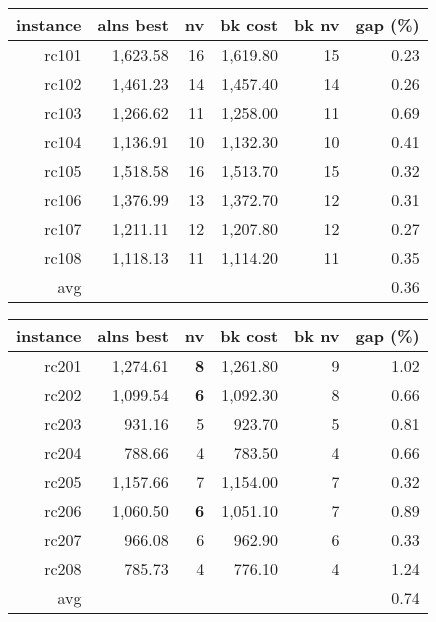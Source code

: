   \begin{table}[caption={Kết quả đo với tập Solomon RC1}, label=exp:solomonRC1, placement=h]
    \small
    \centering
    \begin{tabular}{rrrrrr}
    \hline
    instance & alns best & nv & bk cost & bk nv & gap (\%) \\ \hline
    rc101 & 1,623.58 & 16 & 1,619.80 & 15 & 0.23 \\ \hline
    rc102 & 1,461.23 & 14 & 1,457.40 & 14 & 0.26 \\ \hline
    rc103 & 1,266.62 & 11 & 1,258.00 & 11 & 0.69 \\ \hline
    rc104 & 1,136.91 & 10 & 1,132.30 & 10 & 0.41 \\ \hline
    rc105 & 1,518.58 & 16 & 1,513.70 & 15 & 0.32 \\ \hline
    rc106 & 1,376.99 & 13 & 1,372.70 & 12 & 0.31 \\ \hline
    rc107 & 1,211.11 & 12 & 1,207.80 & 12 & 0.27 \\ \hline
    rc108 & 1,118.13 & 11 & 1,114.20 & 11 & 0.35 \\ \hline
    avg &  &  &  &  & 0.36 \\ \hline
    \end{tabular}
  \end{table}

  \begin{table}[caption={Kết quả đo với tập Solomon RC2}, label=exp:solomonRC2, placement=h]
    \small
    \centering
    \begin{tabular}{rrrrrr}
    \hline
    instance & alns best & nv & bk cost & bk nv & gap (\%) \\ \hline
    rc201 & 1,274.61 & \textbf{8} & 1,261.80 & 9 & 1.02 \\ \hline
    rc202 & 1,099.54 & \textbf{6} & 1,092.30 & 8 & 0.66 \\ \hline
    rc203 & 931.16 & 5 & 923.70 & 5 & 0.81 \\ \hline
    rc204 & 788.66 & 4 & 783.50 & 4 & 0.66 \\ \hline
    rc205 & 1,157.66 & 7 & 1,154.00 & 7 & 0.32 \\ \hline
    rc206 & 1,060.50 & \textbf{6} & 1,051.10 & 7 & 0.89 \\ \hline
    rc207 & 966.08 & 6 & 962.90 & 6 & 0.33 \\ \hline
    rc208 & 785.73 & 4 & 776.10 & 4 & 1.24 \\ \hline
    avg &  &  &  &  & 0.74 \\ \hline
    \end{tabular}
  \end{table}

